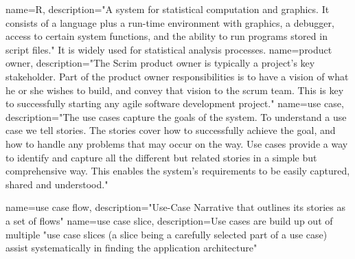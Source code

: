 {
  name={R},
  description={"A system for statistical computation and graphics. It consists of a language plus a run-time environment with graphics, a debugger, access to certain system functions, and the ability to run programs stored in script files." It is widely used for statistical analysis processes. \cite{R}}
}
{
  name={product owner},
  description={"The Scrim product owner is typically a project's key stakeholder. Part of the product owner responsibilities is to have a vision of what he or she wishes to build, and convey that vision to the scrum team. This is key to successfully starting any agile software development project." \cite{product_owner}}
}
{
  name={use case},
  description={"The use cases capture the goals of the system. To understand a use case we tell stories. The stories cover how to successfully achieve the goal, and how to handle any problems that may occur on the way. Use cases provide a way to identify and capture all the different but related stories in a simple but comprehensive way. This enables the system’s requirements to be easily captured, shared and understood." \cite{jacobson2011usecase}}
  }

{
  name={use case flow},
  description={"Use-Case Narrative that outlines its stories as a set of flows" \cite{jacobson2011usecase}}
}
{
  name={use case slice},
  description={Use cases are build up out of multiple "use case slices (a slice being a carefully selected part of a use case) assist systematically in finding the application architecture" \cite{jacobson2011usecase}}
}



\printglossaries

\newpage